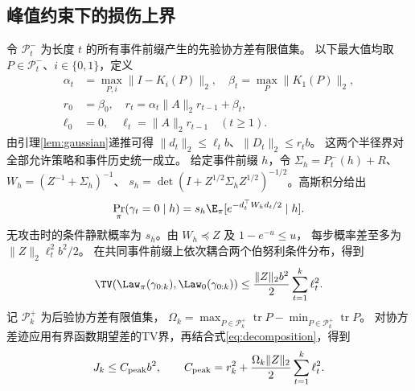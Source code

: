 \subsection{峰值约束下的损伤上界}
令 $\mathcal P_t^-$ 为长度 $t$ 的所有事件前缀产生的先验协方差有限值集。
以下最大值均取 $P\in\mathcal P_t^-$、$i\in\{0,1\}$，定义
\begin{equation}
 \begin{aligned}
 \alpha_t&=\max_{P,i}\|I-K_i(P)\|_2,\quad
 \beta_t=\max_P\|K_1(P)\|_2,\\
 r_0&=\beta_0,\quad r_t=\alpha_t\|A\|_2r_{t-1}+\beta_t,\\
 \ell_0&=0,\quad \ell_t=\|A\|_2r_{t-1}\quad(t\ge1).
 \end{aligned}
 \label{eq:radii}
\end{equation}
由引理\ref{lem:gaussian}递推可得 $\|d_t\|_2\le\ell_tb$、$\|D_t\|_2\le r_tb$。
这两个半径界对全部允许策略和事件历史统一成立。
给定事件前缀 $h$，令 $\Sigma_h=P_t^-(h)+R$、
$W_h=(Z^{-1}+\Sigma_h)^{-1}$、
$s_h=\det(I+Z^{1/2}\Sigma_hZ^{1/2})^{-1/2}$。高斯积分给出
\begin{equation}
 \Pr_\pi(\gamma_t=0\mid h)
 =s_h\E_\pi[e^{-d_t^\top W_hd_t/2}\mid h].
 \label{eq:prefix-silence}
\end{equation}
无攻击时的条件静默概率为 $s_h$。由 $W_h\preceq Z$ 及 $1-e^{-u}\le u$，
每步概率差至多为 $\|Z\|_2\ell_t^2b^2/2$。
在共同事件前缀上依次耦合两个伯努利条件分布，得到
\begin{equation}
 \TV(\Law_\pi(\gamma_{0:k}),\Law_0(\gamma_{0:k}))
 \le\frac{\|Z\|_2b^2}{2}\sum_{t=1}^k\ell_t^2.
 \label{eq:prefix-tv}
\end{equation}
记 $\mathcal P_k^+$ 为后验协方差有限值集，
$\Omega_k=\max_{P\in\mathcal P_k^+}\operatorname{tr}P-
\min_{P\in\mathcal P_k^+}\operatorname{tr}P$。
对协方差迹应用有界函数期望差的TV界，再结合式\eqref{eq:decomposition}，得到
\begin{equation}
 J_k\le C_{\rm peak}b^2,\qquad
 C_{\rm peak}=r_k^2+\frac{\Omega_k\|Z\|_2}{2}\sum_{t=1}^k\ell_t^2.
 \label{eq:peak-bound}
\end{equation}

